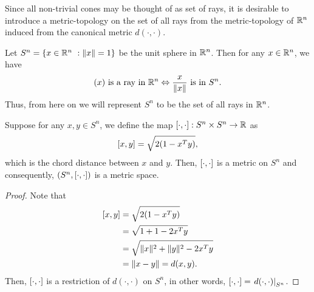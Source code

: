 \documentclass[11pt,a4paper]{article}
\begin{document}
Since all non-trivial cones may be thought of as set of rays, it is desirable to introduce a metric-topology on the set of all rays from the metric-topology of $\mathbb{R}^n$ induced from the canonical metric $d(\cdot,\cdot)$.

\begin{remark}
    Let $S^n = \{x\in \mathbb{R}^n\ : \|x\| = 1\}$ be the unit sphere in $\mathbb{R}^n$. Then for any $x\in \mathbb{R}^n$, we have
    \begin{equation*}
        (x) \text{ is a ray in } \mathbb{R}^n \Leftrightarrow \frac{x}{\|x\|} \text{ is in } S^n.
    \end{equation*}
    Thus, from here on we will represent $S^n$ to be the set of all rays in $\mathbb{R}^n$.
\end{remark}


\begin{proposition}
    Suppose for any $x,y\in S^n$, we define the map $[\cdot, \cdot]:S^n\times S^n\rightarrow \mathbb{R}$ as
    \begin{equation*}
        [x, y] = \sqrt{2(1 - x^Ty)},
    \end{equation*}
    which is the chord distance between $x$ and $y$. Then, $[\cdot, \cdot]$ is a metric on $S^n$ and consequently, $(S^n, [\cdot, \cdot])$ is a metric space.
\end{proposition}

\begin{proof}
    Note that 
    \begin{align*}
        [x, y] &= \sqrt{2(1 - x^Ty)} \\
        &= \sqrt{1 + 1 - 2x^Ty} \\
        &= \sqrt{\|x\|^2 + \|y\|^2 - 2x^Ty} \\
        &= \|x-y\| = d(x,y).
    \end{align*}
    Then, $[\cdot, \cdot]$ is a restriction of $d(\cdot,\cdot)$ on $S^n$, in other words, $[\cdot, \cdot] = \left.d(\cdot,\cdot)\right|_{S^n}$. 
\end{proof}
\end{document}
